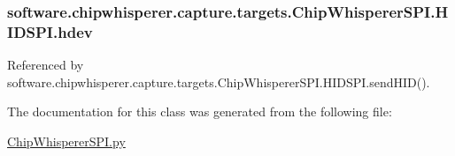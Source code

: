 \subsubsection[{hdev}]{\setlength{\rightskip}{0pt plus 5cm}software.\+chipwhisperer.\+capture.\+targets.\+Chip\+Whisperer\+S\+P\+I.\+H\+I\+D\+S\+P\+I.\+hdev}\label{classsoftware_1_1chipwhisperer_1_1capture_1_1targets_1_1ChipWhispererSPI_1_1HIDSPI_aef45e7999ed3ab1854fc0e8cdbaf17c9}


Referenced by software.\+chipwhisperer.\+capture.\+targets.\+Chip\+Whisperer\+S\+P\+I.\+H\+I\+D\+S\+P\+I.\+send\+H\+I\+D().



The documentation for this class was generated from the following file\+:\begin{DoxyCompactItemize}
\item 
\hyperlink{ChipWhispererSPI_8py}{Chip\+Whisperer\+S\+P\+I.\+py}\end{DoxyCompactItemize}

